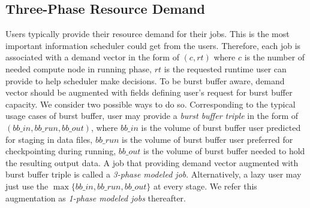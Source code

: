 \subsection{Three-Phase Resource Demand}
Users typically provide their resource demand for their jobs.
This is the most important information scheduler could get from the users.
Therefore, each job is associated with a demand vector in the form of $(c, rt)$
where $c$ is the number of needed compute node in running phase,
$rt$ is the requested runtime user can provide to help scheduler make decisions.
To be burst buffer aware, demand vector should be augmented
with fields defining user's request for burst buffer capacity.
We consider two possible ways to do so.
Corresponding to the typical usage cases of burst buffer,
user may provide a \textit{burst buffer triple} in the form of $(bb\_in, bb\_run, bb\_out)$,
where $bb\_in$ is the volume of burst buffer user predicted for staging in data files,
$bb\_run$ is the volume of burst buffer user preferred for checkpointing during running,
$bb\_out$ is the volume of burst buffer needed to hold the resulting output data.
A job that providing demand vector augmented with
burst buffer triple is called a \textit{3-phase modeled job}.
Alternatively, a lazy user may just use the $\max\{bb\_in, bb\_run, bb\_out\}$ at every stage.
We refer this augmentation as
\textit{1-phase modeled jobs} thereafter.


